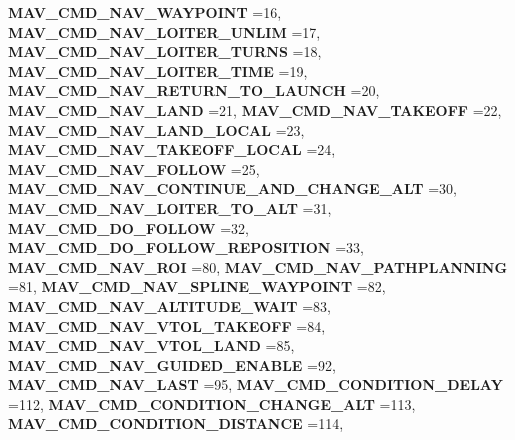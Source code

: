 \begin{DoxyCompactItemize}
\textbf{ M\+A\+V\+\_\+\+C\+M\+D\+\_\+\+N\+A\+V\+\_\+\+W\+A\+Y\+P\+O\+I\+NT} =16, 
\textbf{ M\+A\+V\+\_\+\+C\+M\+D\+\_\+\+N\+A\+V\+\_\+\+L\+O\+I\+T\+E\+R\+\_\+\+U\+N\+L\+IM} =17, 
\textbf{ M\+A\+V\+\_\+\+C\+M\+D\+\_\+\+N\+A\+V\+\_\+\+L\+O\+I\+T\+E\+R\+\_\+\+T\+U\+R\+NS} =18, 
\textbf{ M\+A\+V\+\_\+\+C\+M\+D\+\_\+\+N\+A\+V\+\_\+\+L\+O\+I\+T\+E\+R\+\_\+\+T\+I\+ME} =19, 
\newline
\textbf{ M\+A\+V\+\_\+\+C\+M\+D\+\_\+\+N\+A\+V\+\_\+\+R\+E\+T\+U\+R\+N\+\_\+\+T\+O\+\_\+\+L\+A\+U\+N\+CH} =20, 
\textbf{ M\+A\+V\+\_\+\+C\+M\+D\+\_\+\+N\+A\+V\+\_\+\+L\+A\+ND} =21, 
\textbf{ M\+A\+V\+\_\+\+C\+M\+D\+\_\+\+N\+A\+V\+\_\+\+T\+A\+K\+E\+O\+FF} =22, 
\textbf{ M\+A\+V\+\_\+\+C\+M\+D\+\_\+\+N\+A\+V\+\_\+\+L\+A\+N\+D\+\_\+\+L\+O\+C\+AL} =23, 
\newline
\textbf{ M\+A\+V\+\_\+\+C\+M\+D\+\_\+\+N\+A\+V\+\_\+\+T\+A\+K\+E\+O\+F\+F\+\_\+\+L\+O\+C\+AL} =24, 
\textbf{ M\+A\+V\+\_\+\+C\+M\+D\+\_\+\+N\+A\+V\+\_\+\+F\+O\+L\+L\+OW} =25, 
\textbf{ M\+A\+V\+\_\+\+C\+M\+D\+\_\+\+N\+A\+V\+\_\+\+C\+O\+N\+T\+I\+N\+U\+E\+\_\+\+A\+N\+D\+\_\+\+C\+H\+A\+N\+G\+E\+\_\+\+A\+LT} =30, 
\textbf{ M\+A\+V\+\_\+\+C\+M\+D\+\_\+\+N\+A\+V\+\_\+\+L\+O\+I\+T\+E\+R\+\_\+\+T\+O\+\_\+\+A\+LT} =31, 
\newline
\textbf{ M\+A\+V\+\_\+\+C\+M\+D\+\_\+\+D\+O\+\_\+\+F\+O\+L\+L\+OW} =32, 
\textbf{ M\+A\+V\+\_\+\+C\+M\+D\+\_\+\+D\+O\+\_\+\+F\+O\+L\+L\+O\+W\+\_\+\+R\+E\+P\+O\+S\+I\+T\+I\+ON} =33, 
\textbf{ M\+A\+V\+\_\+\+C\+M\+D\+\_\+\+N\+A\+V\+\_\+\+R\+OI} =80, 
\textbf{ M\+A\+V\+\_\+\+C\+M\+D\+\_\+\+N\+A\+V\+\_\+\+P\+A\+T\+H\+P\+L\+A\+N\+N\+I\+NG} =81, 
\newline
\textbf{ M\+A\+V\+\_\+\+C\+M\+D\+\_\+\+N\+A\+V\+\_\+\+S\+P\+L\+I\+N\+E\+\_\+\+W\+A\+Y\+P\+O\+I\+NT} =82, 
\textbf{ M\+A\+V\+\_\+\+C\+M\+D\+\_\+\+N\+A\+V\+\_\+\+A\+L\+T\+I\+T\+U\+D\+E\+\_\+\+W\+A\+IT} =83, 
\textbf{ M\+A\+V\+\_\+\+C\+M\+D\+\_\+\+N\+A\+V\+\_\+\+V\+T\+O\+L\+\_\+\+T\+A\+K\+E\+O\+FF} =84, 
\textbf{ M\+A\+V\+\_\+\+C\+M\+D\+\_\+\+N\+A\+V\+\_\+\+V\+T\+O\+L\+\_\+\+L\+A\+ND} =85, 
\newline
\textbf{ M\+A\+V\+\_\+\+C\+M\+D\+\_\+\+N\+A\+V\+\_\+\+G\+U\+I\+D\+E\+D\+\_\+\+E\+N\+A\+B\+LE} =92, 
\textbf{ M\+A\+V\+\_\+\+C\+M\+D\+\_\+\+N\+A\+V\+\_\+\+L\+A\+ST} =95, 
\textbf{ M\+A\+V\+\_\+\+C\+M\+D\+\_\+\+C\+O\+N\+D\+I\+T\+I\+O\+N\+\_\+\+D\+E\+L\+AY} =112, 
\textbf{ M\+A\+V\+\_\+\+C\+M\+D\+\_\+\+C\+O\+N\+D\+I\+T\+I\+O\+N\+\_\+\+C\+H\+A\+N\+G\+E\+\_\+\+A\+LT} =113, 
\newline
\textbf{ M\+A\+V\+\_\+\+C\+M\+D\+\_\+\+C\+O\+N\+D\+I\+T\+I\+O\+N\+\_\+\+D\+I\+S\+T\+A\+N\+CE} =114, 

\end{DoxyCompactItemize}
